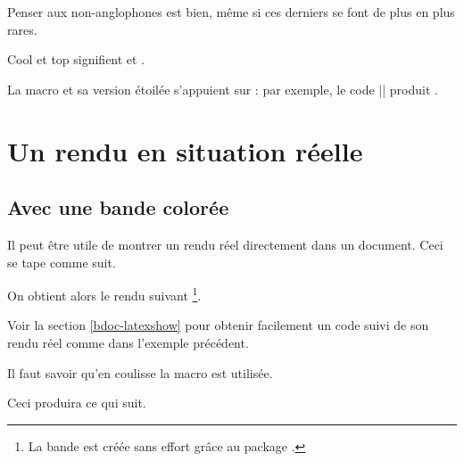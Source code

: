 \documentclass[12pt, a4paper]{article}
\begin{document}
Penser aux non-anglophones est bien, même si ces derniers se font de plus en plus rares.

\begin{bdoclatex}
Cool et top signifient  et .
\end{bdoclatex}


La macro  et sa version étoilée s'appuient sur  : par exemple, le code \bdocinlatex|| produit .


\section{Un rendu en situation réelle} \label{bdoc-showcase}

\subsection{Avec une bande colorée}

\begin{bdocexa}
    Il peut être utile de montrer un rendu réel directement dans un document.
    Ceci se tape comme suit.


    On obtient alors le rendu suivant
    \footnote{
        La bande est créée sans effort grâce au package .
    }.

    \medskip

    
\end{bdocexa}


\begin{bdocrem}
    Voir la section \ref{bdoc-latexshow} pour obtenir facilement un code suivi de son rendu réel comme dans l'exemple précédent.
\end{bdocrem}


\begin{bdocnote}
    Il faut savoir qu'en coulisse la macro  est utilisée.

    \begin{bdoclatex}[std]
    \end{bdoclatex}
\end{bdocnote}




\begin{bdocexa}
    \leavevmode


    Ceci produira ce qui suit.

    \medskip

    
\end{bdocexa}
\end{document}
